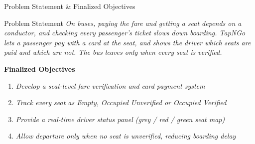 \documentclass[aspectratio=169,11pt]{beamer}
\newcommand{\smallnote}[1]{%
\vspace{0.08cm}
{\scriptsize\color{GEUGrey}#1}
}
\newcommand{\placeholder}[1]{%
\textit{\color{GEUGrey}#1}
}
\begin{document}
\begin{frame}{Problem Statement \& Finalized Objectives}

\begin{block}{Problem Statement}
\placeholder{
On buses, paying the fare and getting a seat depends on a conductor, and checking every passenger’s ticket slows down boarding. TapNGo lets a passenger pay with a card at the seat, and shows the driver which seats are paid and which are not. The bus leaves only when every seat is verified.
}
\end{block}

\vspace{2mm}

\textbf{\color{GEUBlue}Finalized Objectives}

\begin{enumerate}\itemsep3pt
\item \placeholder{Develop a seat-level fare verification and card payment system}
\item \placeholder{Track every seat as Empty, Occupied Unverified or Occupied Verified}
\item \placeholder{Provide a real-time driver status panel (grey / red / green seat map)}
\item \placeholder{Allow departure only when no seat is unverified, reducing boarding delay}
\end{enumerate}

\vfill


\end{frame}
\end{document}
